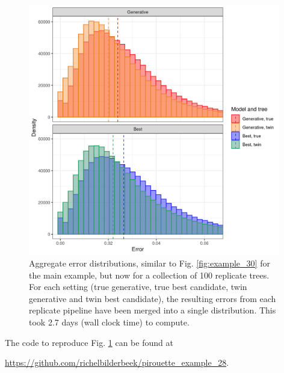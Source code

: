 \begin{figure}[H]
  \includegraphics[width=0.98\textwidth]{pirouette_example_28/errors.png}
  \caption{
    Aggregate error distributions, 
    similar to Fig. \ref{fig:example_30} for the main example, 
    but now for a collection of 100 replicate trees. 
    For each setting (true generative, true best candidate, 
    twin generative and twin best candidate), the resulting errors 
    from each replicate pipeline have been merged into a single distribution. 
    This took 2.7 days (wall clock time) to compute.
  }
  \label{fig:replicate_trees}
\end{figure}


The code to reproduce Fig. \ref{fig:replicate_trees} can be found at  
\begin{sloppypar}
  \url{https://github.com/richelbilderbeek/pirouette_example_28}.
\end{sloppypar}

